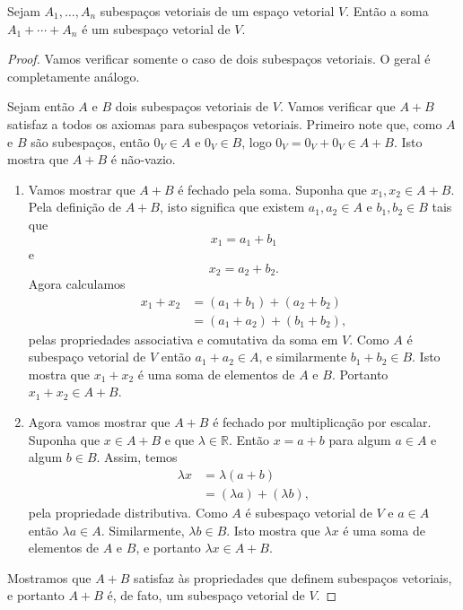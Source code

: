 \begin{theorem}
	Sejam $A_1,\ldots,A_n$ subespaços vetoriais de um espaço vetorial $V$. Então a soma $A_1+\cdots+A_n$ é um subespaço vetorial de $V$.
\end{theorem}

\begin{proof}
	Vamos verificar somente o caso de dois subespaços vetoriais. O geral é completamente análogo.
	
	Sejam então $A$ e $B$ dois subespaços vetoriais de $V$. Vamos verificar que $A+B$ satisfaz a todos os axiomas para subespaços vetoriais. Primeiro note que, como $A$ e $B$ são subespaços, então $0_V\in A$ e $0_V\in B$, logo $0_V=0_V+0_V\in A+B$. Isto mostra que $A+B$ é não-vazio.
	
	\begin{enumerate}
		\item Vamos mostrar que $A+B$ é fechado pela soma. Suponha que $x_1,x_2\in A+B$. Pela definição de $A+B$, isto significa que existem $a_1,a_2\in A$ e $b_1,b_2\in B$ tais que
		\[x_1=a_1+b_1\]
		e
		\[x_2=a_2+b_2.\]
		Agora calculamos
		\begin{align*}
			x_1+x_2&=(a_1+b_1)+(a_2+b_2)\\
			&=(a_1+a_2)+(b_1+b_2),
		\end{align*}
		pelas propriedades associativa e comutativa da soma em $V$. Como $A$ é subespaço vetorial de $V$ então $a_1+a_2\in A$, e similarmente $b_1+b_2\in B$. Isto mostra que $x_1+x_2$ é uma soma de elementos de $A$ e $B$. Portanto $x_1+x_2\in A+B$.
		
		\item Agora vamos mostrar que $A+B$ é fechado por multiplicação por escalar. Suponha que $x\in A+B$ e que $\lambda\in\mathbb{R}$. Então $x=a+b$ para algum $a\in A$ e algum $b\in B$. Assim, temos
		\begin{align*}
			\lambda x&=\lambda(a+b)\\
			&=(\lambda a)+(\lambda b),
		\end{align*}
		pela propriedade distributiva. Como $A$ é subespaço vetorial de $V$ e $a\in A$ então $\lambda a\in A$. Similarmente, $\lambda b\in B$. Isto mostra que $\lambda x$ é uma soma de elementos de $A$ e $B$, e portanto $\lambda x\in A+B$.
	\end{enumerate}
	
	Mostramos que $A+B$ satisfaz às propriedades que definem subespaços vetoriais, e portanto $A+B$ é, de fato, um subespaço vetorial de $V$.
\end{proof}